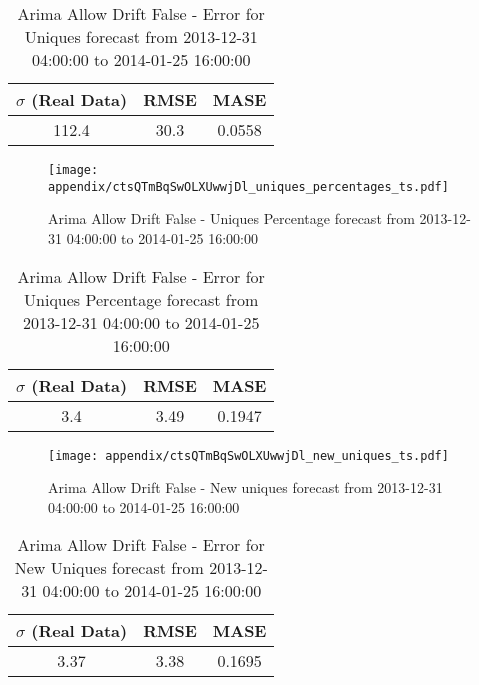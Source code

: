 \begin{table}[H]
\centering
\footnotesize
\begin{tabular}{ccc}
$\sigma$ (Real Data) & RMSE & MASE   \\ \hline
112.4 & 30.3 & 0.0558 \\
\end{tabular}

\vspace{0.5cm}

\caption{
Arima Allow Drift False - Error for Uniques forecast from 2013-12-31 04:00:00 to 2014-01-25 16:00:00}
\end{table}

\begin{figure}[H] \begin{center} \leavevmode
\texttt{[image: appendix/ctsQTmBqSwOLXUwwjDl\_uniques\_percentages\_ts.pdf]} \caption{
Arima Allow Drift False - Uniques Percentage forecast from 2013-12-31 04:00:00 to 2014-01-25 16:00:00} \label{fig:appendix/ctsQTmBqSwOLXUwwjDl_uniques_percentages_ts.pdf} \end{center}
\end{figure}

\begin{table}[H]
\centering
\footnotesize
\begin{tabular}{ccc}
$\sigma$ (Real Data) & RMSE & MASE   \\ \hline
3.4 & 3.49 & 0.1947 \\
\end{tabular}

\vspace{0.5cm}

\caption{
Arima Allow Drift False - Error for Uniques Percentage forecast from 2013-12-31 04:00:00 to 2014-01-25 16:00:00}
\end{table}

\begin{figure}[H] \begin{center} \leavevmode
\texttt{[image: appendix/ctsQTmBqSwOLXUwwjDl\_new\_uniques\_ts.pdf]} \caption{
Arima Allow Drift False - New uniques forecast from 2013-12-31 04:00:00 to 2014-01-25 16:00:00} \label{fig:appendix/ctsQTmBqSwOLXUwwjDl_new_uniques_ts.pdf} \end{center}
\end{figure}

\begin{table}[H]
\centering
\footnotesize
\begin{tabular}{ccc}
$\sigma$ (Real Data) & RMSE & MASE   \\ \hline
3.37 & 3.38 & 0.1695 \\
\end{tabular}

\vspace{0.5cm}

\caption{
Arima Allow Drift False - Error for New Uniques forecast from 2013-12-31 04:00:00 to 2014-01-25 16:00:00}
\end{table}

